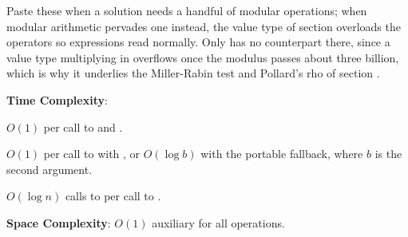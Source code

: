 Paste these when a solution needs a handful of modular operations; when modular arithmetic pervades one instead, the  value type of section  overloads the operators so expressions read normally. Only  has no counterpart there, since a value type multiplying in  overflows once the modulus passes about three billion, which is why it underlies the Miller-Rabin test and Pollard's rho of section .

\textbf{Time Complexity}:
\begin{compactitem}
  \item $O(1)$ per call to  and .
  \item $O(1)$ per call to  with , or $O(\log b)$ with the portable fallback, where $b$ is the second argument.
  \item $O(\log n)$ calls to  per call to .
\end{compactitem}

\textbf{Space Complexity}: $O(1)$ auxiliary for all operations.

